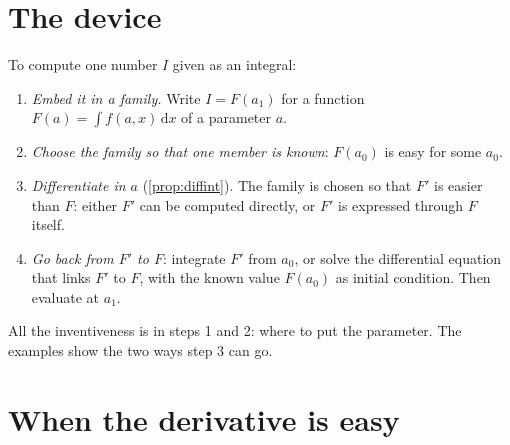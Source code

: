 \section{The device}
\label{sec:feyn-idea}

To compute one number $I$ given as an integral:
\begin{enumerate}[nosep]
  \item \emph{Embed it in a family.} Write $I=F(a_1)$ for a function
        $F(a)=\int f(a,x)\,\mathrm dx$ of a parameter $a$.
  \item \emph{Choose the family so that one member is known}:
        $F(a_0)$ is easy for some $a_0$.
  \item \emph{Differentiate in $a$} (\cref{prop:diffint}). The family is
        chosen so that $F'$ is easier than $F$: either $F'$ can be
        computed directly, or $F'$ is expressed through $F$ itself.
  \item \emph{Go back from $F'$ to $F$}: integrate $F'$ from $a_0$, or
        solve the differential equation that links $F'$ to $F$, with the
        known value $F(a_0)$ as initial condition. Then evaluate at
        $a_1$.
\end{enumerate}
All the inventiveness is in steps 1 and 2: where to put the parameter.
The examples show the two ways step 3 can go.

\section{When the derivative is easy}
\label{sec:feyn-easy}

